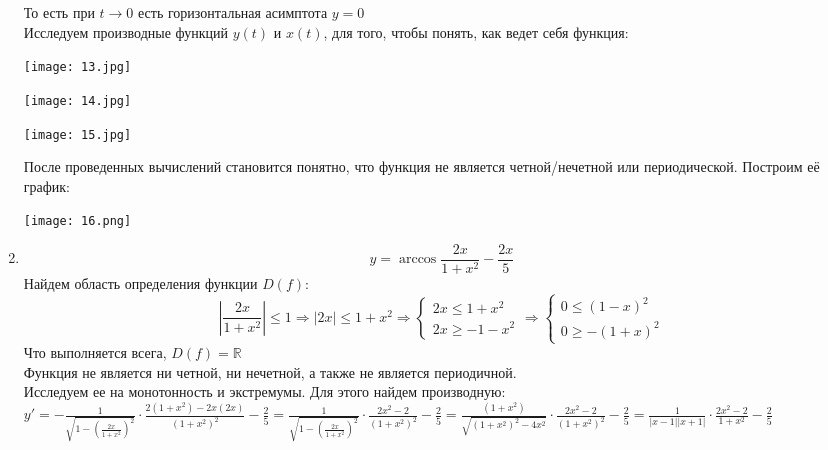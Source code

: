 \begin{enumerate}
\[    \]
    То есть при $t\rightarrow 0$ есть горизонтальная асимптота $y = 0$\\
    Исследуем производные функций $y(t)$ и $x(t)$, для того, чтобы понять, как ведет себя функция: \\
    \begin{center}\texttt{[image: 13.jpg]}\end{center}
    \begin{center}\texttt{[image: 14.jpg]}\end{center}
    \begin{center}\texttt{[image: 15.jpg]}\end{center}
    После проведенных вычислений становится понятно, что функция не является четной/нечетной или периодической. 
    Построим её график:
    \begin{center}\texttt{[image: 16.png]}\end{center}
    \item 
    \[
        y = \arccos{\frac{2x}{1+x^2}} - \frac{2x}{5}
    \]
    Найдем область определения функции $D(f)$: \\
    \begin{equation*}
        \left|\frac{2x}{1+x^2}\right| \leq 1 
        \Rightarrow |2x| \leq 1+x^2 
        \Rightarrow \begin{cases}
            2x \leq 1+x^2 \\
            2x \geq -1 - x^2 
        \end{cases} \Rightarrow
        \begin{cases}
            0 \leq (1-x)^2 \\
            0 \geq -(1 + x)^2 
        \end{cases}
    \end{equation*}
    Что выполняется всега, $D(f) = \mathbb{R}$ \\
    Функция не является ни четной, ни нечетной, а также не является периодичной. \\
    Исследуем ее на монотонность и экстремумы. Для этого найдем производную: \\
    $y'=-\frac{1}{\sqrt{1-\left(\frac{2x}{1+x^2}\right)^2}}\cdot\frac{2(1+x^2)-2x(2x)}{(1+x^2)^2}-\frac{2}{5} = \frac{1}{\sqrt{1-\left(\frac{2x}{1+x^2}\right)^2}}\cdot\frac{2x^2 -2}{(1+x^2)^2}-\frac{2}{5}= \frac{(1+x^2)}{\sqrt{(1+x^2)^2-4x^2}}\cdot\frac{2x^2 -2}{(1+x^2)^2}-\frac{2}{5}=\frac{1}{|x-1||x+1|}\cdot\frac{2x^2 -2}{1+x^2}-\frac{2}{5}$ \\

\end{enumerate}
